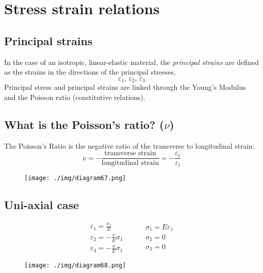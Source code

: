 \section{Stress strain relations}
\subsection{Principal strains}
In the case of an isotropic, linear-elastic material, the \textit{principal strains} are defined as the strains in the directions of the principal stresses.
\begin{equation}
  \varepsilon_1, \, \varepsilon_2, \, \varepsilon_3
\end{equation}
Principal stress and principal strains are linked through the Young's Modulus and the Poisson ratio (constitutive relations).
\subsection{What is the Poisson's ratio? ($\nu$)}
The Poisson's Ratio is the negative ratio of the transverse to longitudinal strain:
\begin{equation}
  \nu = -\frac{\textrm{transverse strain}}{\textrm{longitudinal strain}} = - \frac{\varepsilon_t}{\varepsilon_l}
\end{equation}
\begin{figure}[H]
  \centering
  \texttt{[image: ./img/diagram67.png]}
  \caption{}
\end{figure}
\subsection{Uni-axial case}
\begin{equation}
  \begin{array}{l}
    \varepsilon_1 = \frac{\sigma_1}{E}    \\
    \varepsilon_2 =-\frac{\nu}{E}\sigma_1 \\
    \varepsilon_3 =-\frac{\nu}{E}\sigma_1
  \end{array} \hspace{1cm} \begin{array}{l}
    \sigma_1 = E\varepsilon_1 \\
    \sigma_2 = 0              \\
    \sigma_3 = 0
  \end{array}
\end{equation}
\begin{figure}[H]
  \centering
  \texttt{[image: ./img/diagram68.png]}
  \caption{}
\end{figure}
